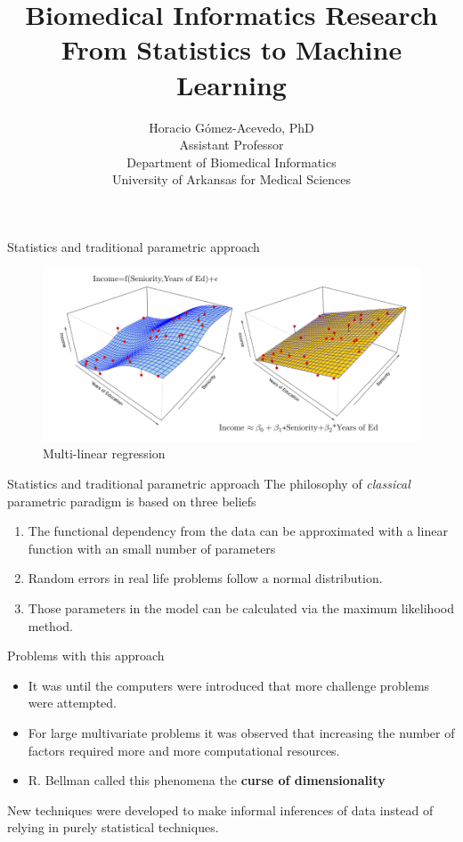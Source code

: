 \documentclass{beamer}
\title{Biomedical Informatics Research\\ From Statistics to Machine Learning}
\author{Horacio G\'omez-Acevedo, PhD\\ Assistant Professor\\Department of Biomedical Informatics\\
	University of Arkansas for Medical Sciences}
\begin{document}
	\begin{frame}[plain]
		\maketitle
	\end{frame}

\begin{frame}{Statistics and traditional parametric approach}
	\begin{figure}[h]
	\centering
	\includegraphics[scale=0.75]{Figures/fig_stat_reg.pdf}
	\caption{Multi-linear regression}
\end{figure}
\end{frame}


\begin{frame}{Statistics and traditional parametric approach}
	The philosophy of \textit{classical} parametric paradigm is based on three beliefs
	\begin{enumerate}
		\item The functional dependency from the data can be approximated with a linear function with an small number of parameters
		\item Random errors in real life problems follow a normal distribution.
		\item Those parameters  in the model can be calculated via the maximum likelihood method.
	\end{enumerate}
\end{frame}

\begin{frame}{Problems with this approach}
	\begin{itemize}
		\item 	It was until the computers were introduced that more challenge problems were attempted.
		\item For large multivariate problems it was observed that increasing the number of factors required more and more computational resources.
		\item R. Bellman called this phenomena the \textbf{curse of dimensionality} 
	\end{itemize}

	New techniques were developed to make informal inferences of data instead of relying in purely statistical techniques. 

\end{frame}
\end{document}
